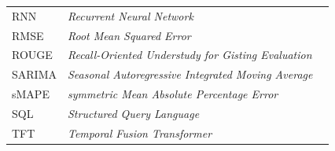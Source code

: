 \begin{longtable}{@{} l >{\raggedright\arraybackslash}p{7.5cm} c @{}}
RNN & \textit{Recurrent Neural Network} & \pageref{abbr:RNN} \\
RMSE & \textit{Root Mean Squared Error} & \pageref{abbr:RMSE} \\
ROUGE & \textit{Recall-Oriented Understudy for Gisting Evaluation} & \pageref{abbr:ROUGE} \\
SARIMA & \textit{Seasonal Autoregressive Integrated Moving Average} & \pageref{abbr:SARIMA} \\
sMAPE & \textit{symmetric Mean Absolute Percentage Error} & \pageref{abbr:sMAPE} \\
SQL & \textit{Structured Query Language} & \pageref{abbr:SQL} \\
TFT & \textit{Temporal Fusion Transformer} & \pageref{abbr:TFT} \\

\end{longtable}

